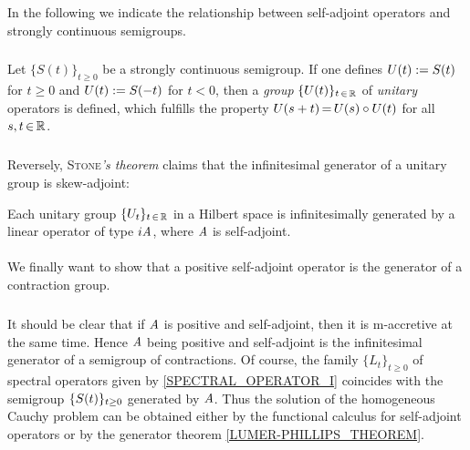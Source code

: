 \documentclass[11pt,twoside]{article}
\begin{document}
\subsubsection*{} %
In the following we indicate the relationship between self-adjoint operators
and strongly continuous semigroups.

\subparagraph*{}
Let $\{S(t)\}_{t \geq 0}$ be a strongly continuous semigroup.
If one defines ${U}(t) := {S}(t)$ for $t \geq 0$ and ${U}(t) := {S}(-t)$ for $t < 0$,
then a \textit{group} $\{U(t)\}_{t {\,\in\,} {\mathbb{R}}}$ of \textit{unitary} operators is defined,
which fulfills
the property ${U}(s+t) {\,=\,} {U}(s) \circ {U}(t)$ for all $s,t {\,\in\,} {\mathbb{R}}$.

\subparagraph*{}
Reversely, 
\textsc{Stone}\textit{'s theorem} claims
that the infinitesimal generator of a unitary group is skew-adjoint:

\begin{theorem}\label{STONE_THEOREM_FOR_UNITARY_GROUPS}
Each unitary group $\{{U}_t\}_{t {\,\in\,} {\mathbb{R}}}$ in a Hilbert space
is infinitesimally generated by a linear operator of type $i \mathit{A}$,
where $\mathit{A}$ is self-adjoint.
\end{theorem}

\paragraph*{} %
We finally want to show that a positive self-adjoint operator is the generator
of a contraction group.

\subparagraph*{}
It should be clear that if $\mathit{A}$ is positive and self-adjoint,
then it is m-accretive at the same time.
Hence $\mathit{A}$ being positive and self-adjoint is the infinitesimal generator
of a semigroup of contractions.
Of course, the family $\{L_t\}_{t \geq 0}$ of spectral operators
given by \eqref{SPECTRAL_OPERATOR_I} coincides with the semigroup
$\{{S}(t)\}_{t \geq 0}$ generated by $\mathit{A}$.
Thus the solution of the homogeneous Cauchy problem can be obtained either
by the functional calculus for self-adjoint operators or by the generator
theorem \ref{LUMER-PHILLIPS_THEOREM}.

\newpage
\thispagestyle{empty}
\end{document}
